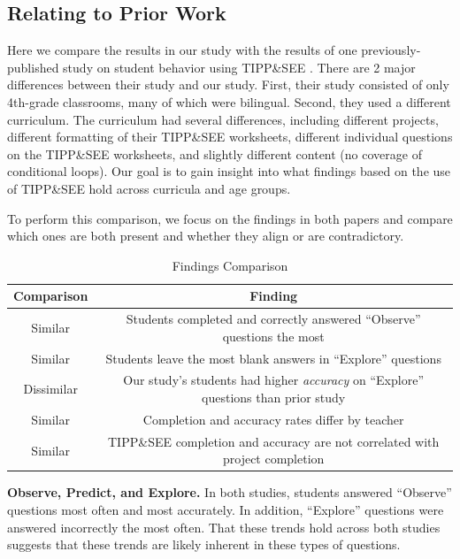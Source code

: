 \documentclass[sigconf,manuscript,review,anonymous]{acmart} %
\def\ts{TIPP\&SEE}
\begin{document}
\subsection{Relating to Prior Work}
\label{sec:compare}
Here we compare the results in our study with the results of one previously-published study on
student behavior using \ts{} \cite{franklin2020exploring}. There are 2 major differences between their study and our study. First, their study consisted of only 4th-grade classrooms, many of which were bilingual. Second, they used a different curriculum. The curriculum had several differences, including different projects, different formatting of their \ts{} worksheets, different individual questions on the \ts{} worksheets, and slightly different content (no coverage of conditional loops). Our goal is to gain insight into what findings based on the use of \ts{} hold across curricula and age groups.

To perform this comparison, we focus on the findings in both papers and compare which ones are both present and whether they align or are contradictory. 

\begin{table}
    \centering
\begin{tabular}{| c | c |} 
      \hline
Comparison & Finding \\ \hline
Similar & Students completed and correctly answered ``Observe'' questions the most \\ \hline
Similar & Students leave the most blank answers in ``Explore'' questions \\ \hline
Dissimilar & Our study's students had higher \textit{accuracy} on ``Explore'' questions than prior study \\ \hline
Similar & Completion and accuracy rates differ by teacher \\ \hline
Similar & \ts{} completion and accuracy are not correlated with project completion \\ \hline



   \end{tabular}

    \caption{Findings Comparison}
    \label{tab:table2}
\end{table}


\textbf{Observe, Predict, and Explore.} 
In both studies, students answered ``Observe'' questions most often and most accurately. In addition, ``Explore'' questions were answered incorrectly the most often. That these trends hold across both studies suggests that these trends are likely inherent in these types of questions. 
\end{document}
